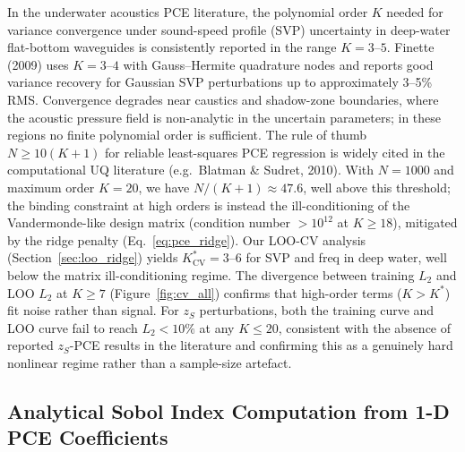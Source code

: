\documentclass[11pt,a4paper]{article}
\begin{document}
In the underwater acoustics PCE literature, the polynomial order $K$ needed for
variance convergence under sound-speed profile (SVP) uncertainty in deep-water
flat-bottom waveguides is consistently reported in the range $K = 3$--$5$.
Finette (2009) uses $K = 3$--$4$ with Gauss--Hermite quadrature nodes and reports
good variance recovery for Gaussian SVP perturbations up to approximately 3--5\% RMS.
Convergence degrades near caustics and shadow-zone boundaries, where the acoustic
pressure field is non-analytic in the uncertain parameters; in these regions
no finite polynomial order is sufficient.
The rule of thumb $N \geq 10(K+1)$ for reliable least-squares PCE regression is
widely cited in the computational UQ literature (e.g.\ Blatman \& Sudret, 2010).
With $N = 1000$ and maximum order $K = 20$, we have $N/(K+1) \approx 47.6$, well
above this threshold; the binding constraint at high orders is instead the
ill-conditioning of the Vandermonde-like design matrix (condition number $>10^{12}$
at $K \geq 18$), mitigated by the ridge penalty (Eq.~\ref{eq:pce_ridge}).
Our LOO-CV analysis (Section~\ref{sec:loo_ridge}) yields $K^*_\text{CV} = 3$--$6$
for SVP and freq in deep water, well below the matrix ill-conditioning regime.
The divergence between training $L_2$ and LOO $L_2$ at $K \geq 7$ (Figure~\ref{fig:cv_all})
confirms that high-order terms ($K > K^*$) fit noise rather than signal.
For $z_S$ perturbations, both the training curve and LOO curve fail to reach
$L_2 < 10\%$ at any $K \leq 20$, consistent with the absence of reported $z_S$-PCE
results in the literature and confirming this as a genuinely hard nonlinear regime
rather than a sample-size artefact.

\subsection{Analytical Sobol Index Computation from 1-D PCE Coefficients}
\label{sec:sobol_formula}
\end{document}
